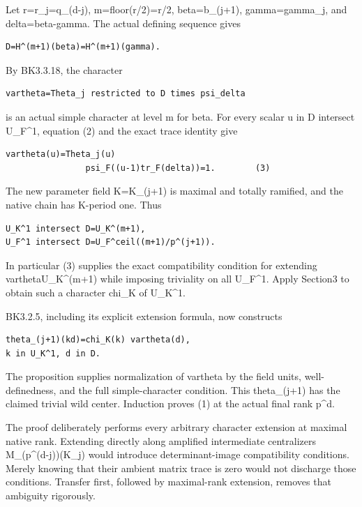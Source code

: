 Let r=r\_j=q\_(d-j), m=floor(r/2)=r/2, beta=b\_(j+1), gamma=gamma\_j,
and delta=beta-gamma. The actual defining sequence gives

\begin{Verbatim}[fontsize=\small,breaklines=true,breakanywhere=true]
D=H^(m+1)(beta)=H^(m+1)(gamma).
\end{Verbatim}

By BK3.3.18, the character

\begin{Verbatim}[fontsize=\small,breaklines=true,breakanywhere=true]
vartheta=Theta_j restricted to D times psi_delta
\end{Verbatim}

is an actual simple character at level m for beta. For every scalar u in
D intersect U\_F\^{}1, equation (2) and the exact trace identity give

\begin{Verbatim}[fontsize=\small,breaklines=true,breakanywhere=true]
vartheta(u)=Theta_j(u)
                psi_F((u-1)tr_F(delta))=1.        (3)
\end{Verbatim}

The new parameter field K=K\_(j+1) is maximal and totally ramified, and
the native chain has K-period one. Thus

\begin{Verbatim}[fontsize=\small,breaklines=true,breakanywhere=true]
U_K^1 intersect D=U_K^(m+1),
U_F^1 intersect D=U_F^ceil((m+1)/p^(j+1)).
\end{Verbatim}

In particular (3) supplies the exact compatibility condition for
extending vartheta\textbar U\_K\^{}(m+1) while imposing triviality on
all U\_F\^{}1. Apply Section3 to obtain such a character chi\_K of
U\_K\^{}1.

BK3.2.5, including its explicit extension formula, now constructs

\begin{Verbatim}[fontsize=\small,breaklines=true,breakanywhere=true]
theta_(j+1)(kd)=chi_K(k) vartheta(d),
k in U_K^1, d in D.
\end{Verbatim}

The proposition supplies normalization of vartheta by the field units,
well-definedness, and the full simple-character condition. This
theta\_(j+1) has the claimed trivial wild center. Induction proves (1)
at the actual final rank p\^{}d.

The proof deliberately performs every arbitrary character extension at
maximal native rank. Extending directly along amplified intermediate
centralizers M\_(p\^{}(d-j))(K\_j) would introduce determinant-image
compatibility conditions. Merely knowing that their ambient matrix trace
is zero would not discharge those conditions. Transfer first, followed
by maximal-rank extension, removes that ambiguity rigorously.

